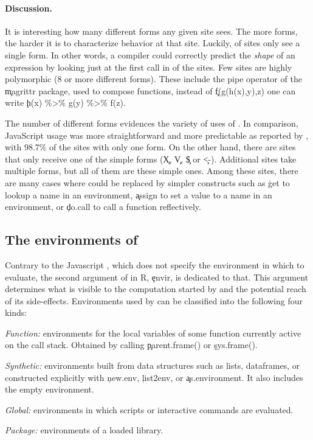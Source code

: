 \documentclass[screen,acmsmall]{acmart}%
\begin{document}
\paragraph{Discussion.}
It is interesting how many different forms any given site sees. The more forms,
the harder it is to characterize behavior at that site. Luckily,
\packageNbOneMinimizedPercent of sites only see a single form. In other words,
a compiler could correctly predict the \emph{shape} of an expression by looking
just at the first call in \packageNbOneMinimizedPercent of the sites. Few sites
are highly polymorphic (8 or more different forms). These include the pipe
operator of the \c{magrittr} package, used to compose functions, \eg instead of
\c{f(g(h(x),y),z)} one can write \c{h(x) \%>\% g(y) \%>\% f(z)}.

The number of different forms evidences the variety of uses of \eval. In
comparison, JavaScript \eval usage was more straightforward and more
predictable as reported by \citet{oopsla12b}, with 98.7\% of the sites with
only one form. On the other hand, there are \packageNbSimpleMinimizedOne sites
that only receive one of the simple forms (\ie\xspace \c{X}, \c{V}, \c{\$} or
\c{<-}). Additional \packageNbSimpleMinimizedMore sites take multiple forms,
but all of them are these simple ones. Among these sites, there are many cases
where \eval could be replaced by simpler constructs such as \c{get} to lookup a
name in an environment, \c{assign} to set a value to a name in an environment,
or \c{do.call} to call a function reflectively.

\subsection{The environments of \eval}\label{sec:env}

Contrary to the Javascript \eval, which does not specify the environment in
which to evaluate, the second argument of \eval in R, \c{envir}, is dedicated to
that. This argument determines what is visible to the computation started by
\eval and the potential reach of its side-effects. Environments used by \eval
can be classified into the following four kinds:

\begin{compactitem}[---]
\item \emph{Function:} environments for the local variables of some function
  currently active on the call stack. Obtained by calling \c{parent.frame()} or
  \c{sys.frame()}.
\item \emph{Synthetic:} environments built from data structures such as lists,
  dataframes, or constructed explicitly with \c{new.env}, \c{list2env}, or
  \c{as.environment}. It also includes the empty environment.
\item \emph{Global:}  environments in which scripts or interactive commands are
  evaluated. \item \emph{Package:}  environments of a loaded library.
\end{compactitem}
\end{document}

